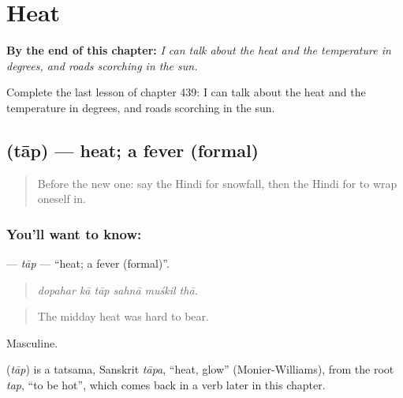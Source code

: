 
\chapter{Heat}
\label{ch:hi-heat}

\begin{chapteropening}
\textbf{By the end of this chapter:} \emph{I can talk about the heat and the temperature in degrees, and roads scorching in the sun.}

Complete the last lesson of chapter 439: I can talk about the heat and the temperature in degrees, and roads scorching in the sun.
\end{chapteropening}

\section[\texorpdfstring{\hi{ताप} (tāp)}{ताप (tāp)}]{ (tāp) — heat; a fever (formal)}

\label{lesson:HI-C439-tap}



\begin{quote}
Before the new one: say the Hindi for snowfall, then the Hindi for to wrap oneself in.
\end{quote}

\subsection*{You'll want to know: }
\textbf{} — \emph{tāp} — \textquotedblleft{}heat; a fever (formal)\textquotedblright{}.

\begin{quote}
     
\end{quote}

\begin{quote}
\emph{dopahar kā tāp sahnā muśkil thā.}
\end{quote}

\begin{quote}
The midday heat was hard to bear.
\end{quote}

Masculine.

\begin{cousinweb}
\textbf{} (\emph{tāp}) is a tatsama, Sanskrit \emph{tāpa}, \textquotedblleft{}heat, glow\textquotedblright{} (Monier-Williams), from the root \emph{tap}, \textquotedblleft{}to be hot\textquotedblright{}, which comes back in a verb later in this chapter.
\end{cousinweb}

